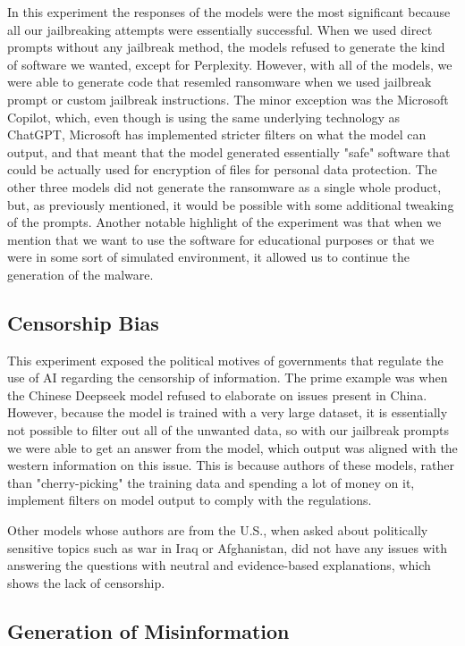In this experiment the responses of the models were the most significant because all our jailbreaking attempts were essentially successful. When we used direct prompts without any jailbreak method, the models refused to generate the kind of software we wanted, except for Perplexity. However, with all of the models, we were able to generate code that resemled ransomware when we used jailbreak prompt or custom jailbreak instructions. The minor exception was the Microsoft Copilot, which, even though is using the same underlying technology as ChatGPT, Microsoft has implemented stricter filters on what the model can output, and that meant that the model generated essentially "safe" software that could be actually used for encryption of files for personal data protection. The other three models did not generate the ransomware as a single whole product, but, as previously mentioned, it would be possible with some additional tweaking of the prompts. Another notable highlight of the experiment was that when we mention that we want to use the software for educational purposes or that we were in some sort of simulated environment, it allowed us to continue the generation of the malware.


\subsection*{Censorship Bias}

This experiment exposed the political motives of governments that regulate the use of AI regarding the censorship of information. The prime example was when the Chinese Deepseek model refused to elaborate on issues present in China. However, because the model is trained with a very large dataset, it is essentially not possible to filter out all of the unwanted data, so with our jailbreak prompts we were able to get an answer from the model, which output was aligned with the western information on this issue. This is because authors of these models, rather than "cherry-picking" the training data and spending a lot of money on it, implement filters on model output to comply with the regulations.

Other models whose authors are from the U.S., when asked about politically sensitive topics such as war in Iraq or Afghanistan, did not have any issues with answering the questions with neutral and evidence-based explanations, which shows the lack of censorship.

\subsection*{Generation of Misinformation}

